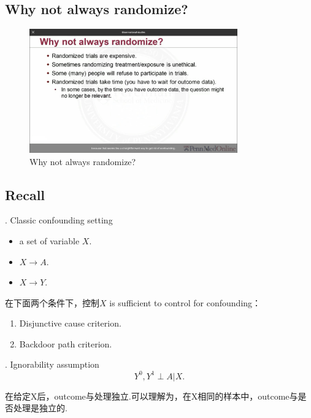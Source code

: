 \subsection{Why not always randomize?}
\begin{figure}[htbp]
	\setlength{\abovecaptionskip}{0pt}     %
	\setlength{\belowcaptionskip}{10pt}
	\vspace{-0cm}  %
	\setlength{\abovecaptionskip}{-0cm}   %
	\setlength{\belowcaptionskip}{-0cm}   %
	\centering
	\includegraphics[width=0.8\textwidth]{figure/rmwhynot.jpg}
	\caption{Why not always randomize?}
	\label{rmwhynot}
\end{figure}

\subsection{Recall}
. Classic confounding setting
\begin{itemize}
	\item a set of variable $X$.
	\item $X \rightarrow A$.
	\item $X \rightarrow Y$.
\end{itemize}

在下面两个条件下，控制$X$ is sufficient to control for confounding：
\begin{enumerate}[itemindent=2em,label=(\arabic*)] 
	\item Disjunctive cause criterion.
	\item Backdoor path criterion.
\end{enumerate}

. Ignorability assumption
\begin{equation}
Y^0,Y^1 \perp A|X.
\end{equation}

在给定X后，outcome与处理独立.可以理解为，在X相同的样本中，outcome与是否处理是独立的.


